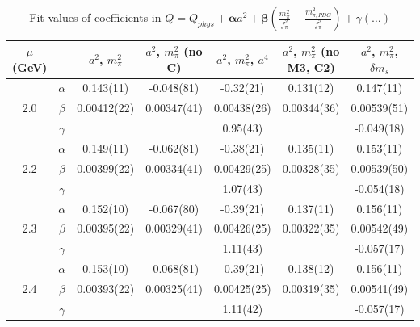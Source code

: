 \documentclass[12pt]{extarticle}
\begin{document}
\begin{table}[h!]
\begin{center}
\begin{tabular}{|c c|c|c|c|c|c|}
\hline
$\mu$ (GeV) &  & $a^2$, $m_\pi^2$& $a^2$, $m_\pi^2$ (no C)& $a^2$, $m_\pi^2$, $a^4$& $a^2$, $m_\pi^2$ (no M3, C2)& $a^2$, $m_\pi^2$, $\delta m_s$\\
\hline
\multirow{3}{0.5in}{2.0} & $\alpha$ & 0.143(11)& -0.048(81)& -0.32(21)& 0.131(12)& 0.147(11)\\
 & $\beta$ & 0.00412(22)& 0.00347(41)& 0.00438(26)& 0.00344(36)& 0.00539(51)\\
 & $\gamma$ &  &  & 0.95(43)&  & -0.049(18)\\
\hline
\multirow{3}{0.5in}{2.2} & $\alpha$ & 0.149(11)& -0.062(81)& -0.38(21)& 0.135(11)& 0.153(11)\\
 & $\beta$ & 0.00399(22)& 0.00334(41)& 0.00429(25)& 0.00328(35)& 0.00539(50)\\
 & $\gamma$ &  &  & 1.07(43)&  & -0.054(18)\\
\hline
\multirow{3}{0.5in}{2.3} & $\alpha$ & 0.152(10)& -0.067(80)& -0.39(21)& 0.137(11)& 0.156(11)\\
 & $\beta$ & 0.00395(22)& 0.00329(41)& 0.00426(25)& 0.00322(35)& 0.00542(49)\\
 & $\gamma$ &  &  & 1.11(43)&  & -0.057(17)\\
\hline
\multirow{3}{0.5in}{2.4} & $\alpha$ & 0.153(10)& -0.068(81)& -0.39(21)& 0.138(12)& 0.156(11)\\
 & $\beta$ & 0.00393(22)& 0.00325(41)& 0.00425(25)& 0.00319(35)& 0.00541(49)\\
 & $\gamma$ &  &  & 1.11(42)&  & -0.057(17)\\
\hline
\end{tabular}
\caption{Fit values of coefficients in $Q = Q_{phys} + \mathbf{\alpha} a^2 + \mathbf{\beta}\left(\frac{m_\pi^2}{f_\pi^2}-\frac{m_{\pi,PDG}^2}{f_\pi^2}\right) + \gamma(\ldots)$}
\end{center}
\end{table}




















\clearpage
\end{document}
